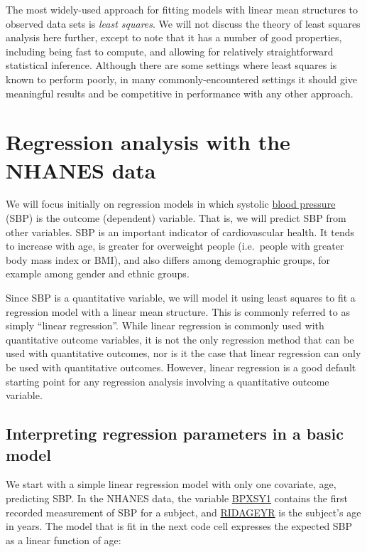 \documentclass[11pt]{article}
\begin{document}
    The most widely-used approach for fitting models with linear mean
structures to observed data sets is \emph{least squares}. We will not
discuss the theory of least squares analysis here further, except to
note that it has a number of good properties, including being fast to
compute, and allowing for relatively straightforward statistical
inference. Although there are some settings where least squares is known
to perform poorly, in many commonly-encountered settings it should give
meaningful results and be competitive in performance with any other
approach.

    \hypertarget{regression-analysis-with-the-nhanes-data}{%
\section{Regression analysis with the NHANES
data}\label{regression-analysis-with-the-nhanes-data}}

    We will focus initially on regression models in which systolic
\href{https://en.wikipedia.org/wiki/Blood_pressure}{blood pressure}
(SBP) is the outcome (dependent) variable. That is, we will predict SBP
from other variables. SBP is an important indicator of cardiovascular
health. It tends to increase with age, is greater for overweight people
(i.e.~people with greater body mass index or BMI), and also differs
among demographic groups, for example among gender and ethnic groups.

    Since SBP is a quantitative variable, we will model it using least
squares to fit a regression model with a linear mean structure. This is
commonly referred to as simply ``linear regression''. While linear
regression is commonly used with quantitative outcome variables, it is
not the only regression method that can be used with quantitative
outcomes, nor is it the case that linear regression can only be used
with quantitative outcomes. However, linear regression is a good default
starting point for any regression analysis involving a quantitative
outcome variable.

    \hypertarget{interpreting-regression-parameters-in-a-basic-model}{%
\subsection{Interpreting regression parameters in a basic
model}\label{interpreting-regression-parameters-in-a-basic-model}}

    We start with a simple linear regression model with only one covariate,
age, predicting SBP. In the NHANES data, the variable
\href{https://wwwn.cdc.gov/Nchs/Nhanes/2015-2016/BPX_I.htm\#BPXSY1}{BPXSY1}
contains the first recorded measurement of SBP for a subject, and
\href{https://wwwn.cdc.gov/Nchs/Nhanes/2015-2016/DEMO_I.htm\#RIDAGEYR}{RIDAGEYR}
is the subject's age in years. The model that is fit in the next code
cell expresses the expected SBP as a linear function of age:
\end{document}
